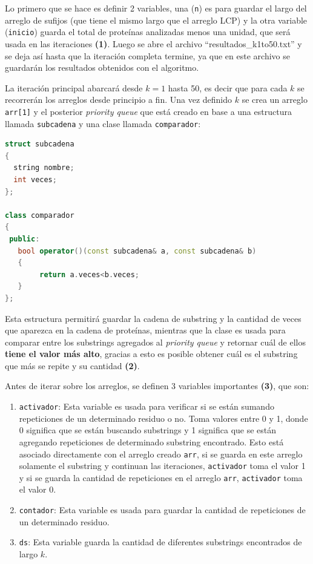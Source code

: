 Lo primero que se hace es definir 2 variables, una (\texttt{n}) es para guardar el largo del arreglo de sufijos (que tiene el mismo largo que el arreglo LCP) y la otra variable (\texttt{inicio}) guarda el total de proteínas analizadas menos una unidad, que será usada en las iteraciones \textbf{(1)}. Luego se abre el archivo ``resultados\_k1to50.txt'' y se deja así hasta que la iteración completa termine, ya que en este archivo se guardarán los resultados obtenidos con el algoritmo.

La iteración principal abarcará desde $k=1$ hasta 50, es decir que para cada $k$ se recorrerán los arreglos desde principio a fin. Una vez definido $k$ se crea un arreglo \texttt{arr[1]} y el posterior \textit{priority queue} que está creado en base a una estructura llamada \texttt{subcadena} y una clase llamada \texttt{comparador}:

\begin{lstlisting}[language=C++, caption=Implementación de \texttt{subcadena} y \texttt{comparador} como soportes del \textit{priority queue} a utilizar]
struct subcadena
{
  string nombre;
  int veces;
};

class comparador
{
 public:
   bool operator()(const subcadena& a, const subcadena& b)
   {
        return a.veces<b.veces;
   }
};	
\end{lstlisting}

Esta estructura permitirá guardar la cadena de substring y la cantidad de veces que aparezca en la cadena de proteínas, mientras que la clase es usada para comparar entre los substrings agregados al \textit{priority queue} y retornar cuál de ellos \textbf{tiene el valor más alto}, gracias a esto es posible obtener cuál es el substring que más se repite y su cantidad \textbf{(2)}.

Antes de iterar sobre los arreglos, se definen 3 variables importantes \textbf{(3)}, que son:

\begin{enumerate}

\item \texttt{activador}: Esta variable es usada para verificar si se están sumando repeticiones de un determinado residuo o no. Toma valores entre 0 y 1, donde 0 significa que se están buscando substrings y 1 significa que se están agregando repeticiones de determinado substring encontrado. Esto está asociado directamente con el arreglo creado \texttt{arr}, si se guarda en este arreglo solamente el substring y continuan las iteraciones, \texttt{activador} toma el valor 1 y si se guarda la cantidad de repeticiones en el arreglo \texttt{arr}, \texttt{activador} toma el valor 0.
\item \texttt{contador}: Esta variable es usada para guardar la cantidad de repeticiones de un determinado residuo.
\item \texttt{ds}: Esta variable guarda la cantidad de diferentes substrings encontrados de largo $k$.
\end{enumerate}

